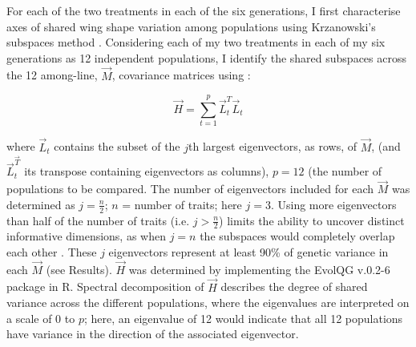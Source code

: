 For each of the two treatments in each of the six generations, I first characterise axes of shared wing shape variation among populations using Krzanowski’s subspaces method \citep{Krza79, Agui14}. Considering each of my two treatments in each of my six generations as 12 independent populations, I identify the shared subspaces across the 12 among-line,  $\vec{M}$, covariance matrices using \citep{Krza79}:\par

\vspace{-\parskip}
\begin{equation}
\vec{H} = \sum_{t=1}^{p} \vec{L}_t^{T}\vec{L}_t \label{eqn:multi_2_H}
\end{equation}

\noindent where $\vec{L}_{t}$ contains the subset of the $j$th largest eigenvectors, as rows, of $\vec{M}$, (and $\vec{L}_{t}^{\vec{T}}$ its transpose containing eigenvectors as columns), $p = 12$ (the number of populations to be compared. The number of eigenvectors included for each $\vec{M}$ was determined as $j = \frac{n}{2}$; $n$ = number of traits; here $j = 3$. Using more eigenvectors than half of the number of traits (i.e. $j >  \frac{n}{2}$) limits the ability to uncover distinct informative dimensions, as when $j = n$ the subspaces would completely overlap each other \citep[further explanation given by][]{Blow04}. These $j$ eigenvectors represent at least 90\% of genetic variance in each $\vec{M}$ (see Results). $\vec{H}$ was determined by implementing the EvolQG v.0.2-6 \citep{Melo15} package in R. Spectral decomposition of $\vec{H}$ describes the degree of shared variance across the different populations, where the eigenvalues are interpreted on a scale of 0 to $p$; here, an eigenvalue of 12 would indicate that all 12 populations have variance in the direction of the associated eigenvector.\par 

